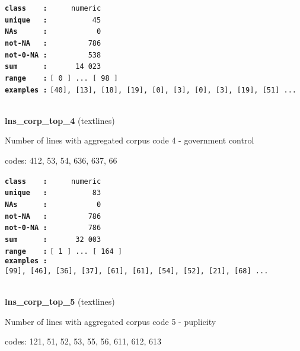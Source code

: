 \documentclass[]{article}
\begin{document}
\textbf{\texttt{class\ \ \ \ :}} \texttt{~~~~~numeric}\\
\textbf{\texttt{unique\ \ \ :}} \texttt{~~~~~~~~~~45}\\
\textbf{\texttt{NAs\ \ \ \ \ \ :}} \texttt{~~~~~~~~~~~0}\\
\textbf{\texttt{not-NA\ \ \ :}} \texttt{~~~~~~~~~786}\\
\textbf{\texttt{not-0-NA\ :}} \texttt{~~~~~~~~~538}\\
\textbf{\texttt{sum\ \ \ \ \ \ :}} \texttt{~~~~~~14~023}\\
\textbf{\texttt{range\ \ \ \ :}}
\texttt{{[}\ 0\ {]}\ ...\ {[}\ 98\ {]}}\\
\textbf{\texttt{examples\ :}}
\texttt{{[}40{]},\ {[}13{]},\ {[}18{]},\ {[}19{]},\ {[}0{]},\ {[}3{]},\ {[}0{]},\ {[}3{]},\ {[}19{]},\ {[}51{]}\ ...}\\

~

\textbf{lns\_corp\_top\_4} (textlines)

Number of lines with aggregated corpus code 4 - government control

codes: 412, 53, 54, 636, 637, 66

\textbf{\texttt{class\ \ \ \ :}} \texttt{~~~~~numeric}\\
\textbf{\texttt{unique\ \ \ :}} \texttt{~~~~~~~~~~83}\\
\textbf{\texttt{NAs\ \ \ \ \ \ :}} \texttt{~~~~~~~~~~~0}\\
\textbf{\texttt{not-NA\ \ \ :}} \texttt{~~~~~~~~~786}\\
\textbf{\texttt{not-0-NA\ :}} \texttt{~~~~~~~~~786}\\
\textbf{\texttt{sum\ \ \ \ \ \ :}} \texttt{~~~~~~32~003}\\
\textbf{\texttt{range\ \ \ \ :}}
\texttt{{[}\ 1\ {]}\ ...\ {[}\ 164\ {]}}\\
\textbf{\texttt{examples\ :}}
\texttt{{[}99{]},\ {[}46{]},\ {[}36{]},\ {[}37{]},\ {[}61{]},\ {[}61{]},\ {[}54{]},\ {[}52{]},\ {[}21{]},\ {[}68{]}\ ...}\\

~

\textbf{lns\_corp\_top\_5} (textlines)

Number of lines with aggregated corpus code 5 - puplicity

codes: 121, 51, 52, 53, 55, 56, 611, 612, 613
\end{document}
